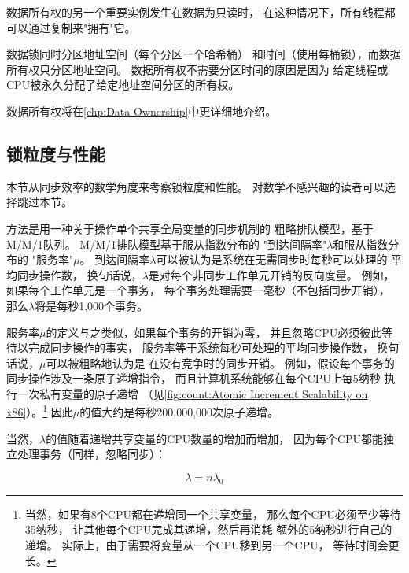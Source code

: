 数据所有权的另一个重要实例发生在数据为只读时，
在这种情况下，所有线程都可以通过复制来"拥有"它。

数据锁同时分区地址空间（每个分区一个哈希桶）
和时间（使用每桶锁），而数据所有权只分区地址空间。
数据所有权不需要分区时间的原因是因为
给定线程或CPU被永久分配了给定地址空间分区的所有权。

\QuickQuizEnd

数据所有权将在\cref{chp:Data Ownership}中更详细地介绍。

\subsection{锁粒度与性能}
\label{sec:SMPdesign:Locking Granularity and Performance}

本节从同步效率的数学角度来考察锁粒度和性能。
对数学不感兴趣的读者可以选择跳过本节。

方法是用一种关于操作单个共享全局变量的同步机制的
粗略排队模型，基于M/M/1队列。
M/M/1排队模型基于服从指数分布的
"到达间隔率"$\lambda$和服从指数分布的
"服务率"$\mu$。
到达间隔率$\lambda$可以被认为是系统在无需同步时每秒可以处理的
平均同步操作数，
换句话说，$\lambda$是对每个非同步工作单元开销的反向度量。
例如，如果每个工作单元是一个事务，
每个事务处理需要一毫秒（不包括同步开销），
那么$\lambda$将是每秒1,000个事务。

服务率$\mu$的定义与之类似，如果每个事务的开销为零，
并且忽略CPU必须彼此等待以完成同步操作的事实，
服务率等于系统每秒可处理的平均同步操作数，
换句话说，$\mu$可以被粗略地认为是
在没有竞争时的同步开销。
例如，假设每个事务的同步操作涉及一条原子递增指令，
而且计算机系统能够在每个CPU上每5纳秒
执行一次私有变量的原子递增
（见\cref{fig:count:Atomic Increment Scalability on x86}）。\footnote{
	当然，如果有8个CPU都在递增同一个共享变量，
	那么每个CPU必须至少等待35纳秒，
	让其他每个CPU完成其递增，然后再消耗
	额外的5纳秒进行自己的递增。
	实际上，由于需要将变量从一个CPU移到另一个CPU，
	等待时间会更长。}
因此$\mu$的值大约是每秒200,000,000次原子递增。

当然，$\lambda$的值随着递增共享变量的CPU数量的增加而增加，
因为每个CPU都能独立处理事务（同样，忽略同步）：

\begin{equation}
	\lambda = n \lambda_0
\end{equation}

